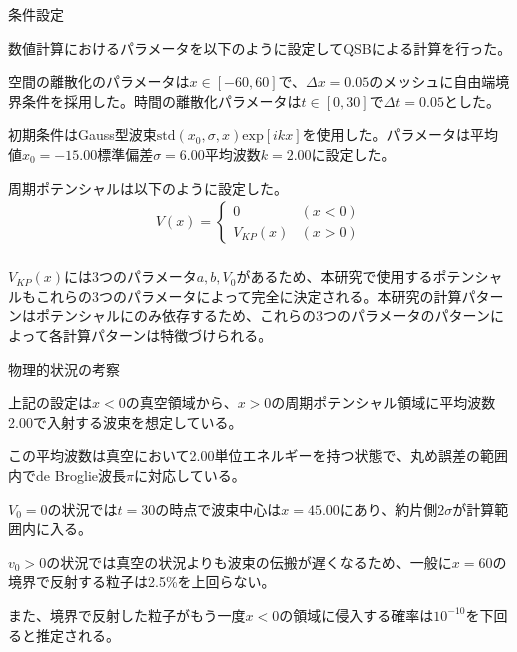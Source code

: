 \documentclass[a4paper, lualatex]{bxjsarticle}
\begin{document}
\begin{section}{条件設定}
    \par 数値計算におけるパラメータを以下のように設定してQSBによる計算を行った。
    \par 空間の離散化のパラメータは$x\in [-60, 60]$で、$\varDelta x=0.05$のメッシュに自由端境界条件を採用した。時間の離散化パラメータは$t\in [0, 30]$で$\varDelta t=0.05$とした。
    \par 初期条件はGauss型波束$\mathrm{std}(x_0, \sigma, x)\mathrm{exp}[ikx]$を使用した。パラメータは平均値$x_0=-15.00$標準偏差$\sigma=6.00$平均波数$k=2.00$に設定した。
    \par 周期ポテンシャルは以下のように設定した。
    \begin{align}
     V(x)=\begin{cases}0&(x<0)\\V_{KP}(x)&(x>0)\end{cases}\nonumber\\
    \end{align}
    \par $V_{KP}(x)$には3つのパラメータ$a, b, V_0$があるため、本研究で使用するポテンシャルもこれらの3つのパラメータによって完全に決定される。本研究の計算パターンはポテンシャルにのみ依存するため、これらの3つのパラメータのパターンによって各計算パターンは特徴づけられる。
    \begin{subsection}{物理的状況の考察}
        \par 上記の設定は$x<0$の真空領域から、$x>0$の周期ポテンシャル領域に平均波数2.00で入射する波束を想定している。
        \par この平均波数は真空において2.00単位エネルギーを持つ状態で、丸め誤差の範囲内でde Broglie波長$\pi$に対応している。
        \par $V_0=0$の状況では$t=30$の時点で波束中心は$x=45.00$にあり、約片側$2\sigma$が計算範囲内に入る。
        \par $v_0>0$の状況では真空の状況よりも波束の伝搬が遅くなるため、一般に$x=60$の境界で反射する粒子は2.5\%を上回らない。
        \par また、境界で反射した粒子がもう一度$x<0$の領域に侵入する確率は$10^{-10}$を下回ると推定される。
    \end{subsection}
\end{section}
\end{document}
